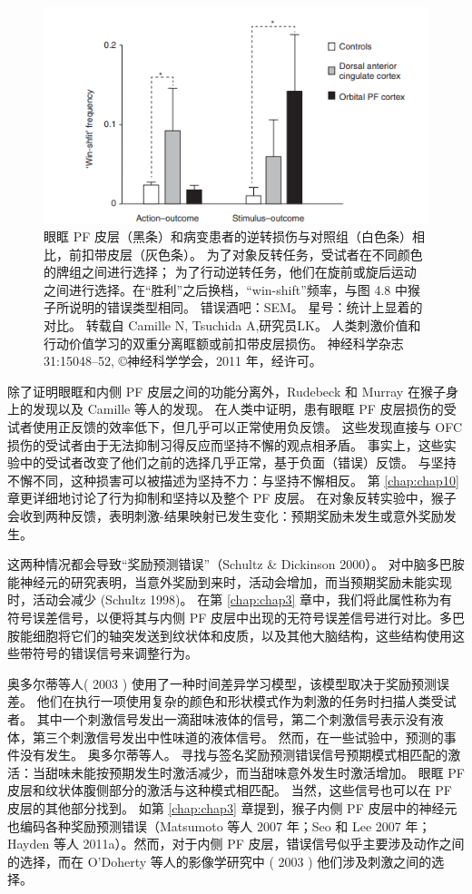 \begin{figure}[!htb]
	\centering
	\includegraphics{image_pfc/Fig_4_9}
	\caption{眼眶 PF 皮层（黑条）和病变患者的逆转损伤与对照组（白色条）相比，前扣带皮层（灰色条）。 为了对象反转任务，受试者在不同颜色的牌组之间进行选择； 为了行动逆转任务，他们在旋前或旋后运动之间进行选择。在“胜利”之后换档，“win-shift”频率，与图 4.8 中猴子所说明的错误类型相同。 错误酒吧：SEM。 星号：统计上显着的对比。 转载自 Camille N, Tsuchida A,研究员LK。 人类刺激价值和行动价值学习的双重分离眶额或前扣带皮层损伤。 神经科学杂志 31:15048–52, ©神经科学学会，2011 年，经许可。}
	\label{fig:fig_4_9}
\end{figure}
 除了证明眼眶和内侧 PF 皮层之间的功能分离外，Rudebeck 和 Murray 在猴子身上的发现以及 Camille 等人的发现。 在人类中证明，患有眼眶 PF 皮层损伤的受试者使用正反馈的效率低下，但几乎可以正常使用负反馈。 这些发现直接与 OFC 损伤的受试者由于无法抑制习得反应而坚持不懈的观点相矛盾。 事实上，这些实验中的受试者改变了他们之前的选择几乎正常，基于负面（错误）反馈。 与坚持不懈不同，这种损害可以被描述为坚持不力：与坚持不懈相反。 第 \ref{chap:chap10} 章更详细地讨论了行为抑制和坚持以及整个 PF 皮层。
在对象反转实验中，猴子会收到两种反馈，表明刺激-结果映射已发生变化：预期奖励未发生或意外奖励发生。\par 这两种情况都会导致“奖励预测错误”（Schultz \& Dickinson 2000）。 对中脑多巴胺能神经元的研究表明，当意外奖励到来时，活动会增加，而当预期奖励未能实现时，活动会减少 (Schultz 1998)。 在第 \ref{chap:chap3} 章中，我们将此属性称为有符号误差信号，以便将其与内侧 PF 皮层中出现的无符号误差信号进行对比。多巴胺能细胞将它们的轴突发送到纹状体和皮质，以及其他大脑结构，这些结构使用这些带符号的错误信号来调整行为。\par
奥多尔蒂等人( 2003 ) 使用了一种时间差异学习模型，该模型取决于奖励预测误差。 他们在执行一项使用复杂的颜色和形状模式作为刺激的任务时扫描人类受试者。 其中一个刺激信号发出一滴甜味液体的信号，第二个刺激信号表示没有液体，第三个刺激信号发出中性味道的液体信号。 然而，在一些试验中，预测的事件没有发生。 奥多尔蒂等人。 寻找与签名奖励预测错误信号预期模式相匹配的激活：当甜味未能按预期发生时激活减少，而当甜味意外发生时激活增加。 眼眶 PF 皮层和纹状体腹侧部分的激活与这种模式相匹配。
当然，这些信号也可以在 PF 皮层的其他部分找到。 如第 \ref{chap:chap3} 章提到，猴子内侧 PF 皮层中的神经元也编码各种奖励预测错误（Matsumoto 等人 2007 年；Seo 和 Lee 2007 年；Hayden 等人 2011a）。然而，对于内侧 PF 皮层，错误信号似乎主要涉及动作之间的选择，而在 O'Doherty 等人的影像学研究中 ( 2003 ) 他们涉及刺激之间的选择。\par
